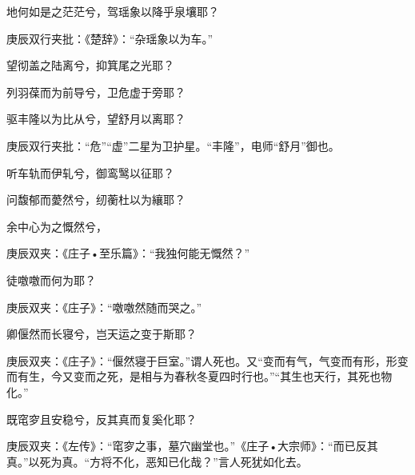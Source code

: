 \begin{qute2sp}
\begin{poem}
        \begin{pl}地何如是之茫茫兮，驾瑶象以降乎泉壤耶？\end{pl}
        \begin{note}庚辰双行夹批：《楚辞》：“杂瑶象以为车。”\end{note}

        \begin{pl}望彻盖之陆离兮，抑箕尾之光耶？\end{pl}

        \begin{pl}列羽葆而为前导兮，卫危虚于旁耶？\end{pl}

        \begin{pl}驱丰隆以为比从兮，望舒月以离耶？\end{pl}
        \begin{note}庚辰双行夹批：“危”“虚”二星为卫护星。“丰隆”，电师“舒月”御也。\end{note}

        \begin{pl}听车轨而伊轧兮，御鸾鹥以征耶？\end{pl}

        \begin{pl}问馥郁而薆然兮，纫蘅杜以为纕耶？\end{pl}

        \begin{pl}余中心为之慨然兮，\end{pl}
        \begin{note}庚辰双夹：《庄子•至乐篇》：“我独何能无慨然？”\end{note}徒噭噭而何为耶？
        \begin{note}庚辰双夹：《庄子》：“噭噭然随而哭之。”\end{note}

        \begin{pl}卿偃然而长寝兮，岂天运之变于斯耶？\end{pl}
        \begin{note}庚辰双夹：《庄子》：“偃然寝于巨室。”谓人死也。又“变而有气，气变而有形，形变而有生，今又变而之死，是相与为春秋冬夏四时行也。”“其生也天行，其死也物化。”\end{note}

        \begin{pl}既窀穸且安稳兮，反其真而复奚化耶？\end{pl}
        \begin{note}庚辰双夹：《左传》：“窀穸之事，墓穴幽堂也。”《庄子•大宗师》：“而已反其真。”以死为真。“方将不化，恶知已化哉？”言人死犹如化去。\end{note}


\end{poem}
\end{qute2sp}
